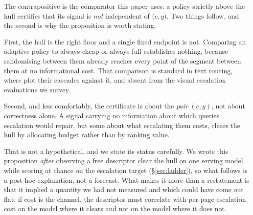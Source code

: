 \documentclass[10pt,twocolumn]{article}
\theoremstyle{plain}
\begin{document}
\vspace{2pt}
The contrapositive is the comparator this paper uses: a policy strictly above
the hull certifies that its signal is \emph{not} independent of
$\bigl(c, y\bigr)$. Two things follow, and the second is why the proposition is
worth stating.

First, the hull is the right floor and a single fixed endpoint is not.
Comparing an adaptive policy to always-cheap or always-full establishes
nothing, because randomising between them already reaches every point of the
segment between them at no informational cost. That comparison is standard in
text routing, where \cite{lugoloobi} plot their cascades against it, and absent
from the visual escalation evaluations we survey.

Second, and less comfortably, the certificate is about the \emph{pair}
$(c, y)$, not about correctness alone. A signal carrying no information about
which queries escalation would repair, but some about what escalating them
costs, clears the hull by allocating budget rather than by ranking value.

That is not a hypothetical, and we state its status carefully. We wrote this
proposition \emph{after} observing a free descriptor clear the hull on one
serving model while scoring at chance on the escalation target
(\S\ref{sec:ladder}), so what follows is a post-hoc explanation, not a
forecast. What makes it more than a restatement is that it implied a quantity
we had not measured and which could have come out flat: if cost is the channel,
the descriptor must correlate with per-page escalation cost on the model where
it clears and not on the model where it does not.

\begin{center}\small
{}
\end{center}
\end{document}
